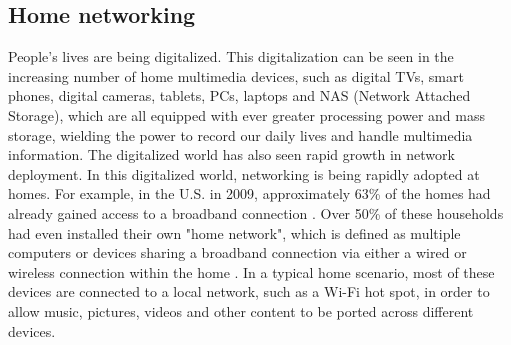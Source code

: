 
\subsection{Home networking}
People's lives are being digitalized. This digitalization can be seen in the
increasing number of home multimedia devices, such as digital TVs, smart
phones, digital cameras, tablets, PCs, laptops and NAS (Network Attached
Storage), which are all equipped with ever greater processing power and mass
storage, wielding the power to record our daily lives and handle multimedia
information. The digitalized world has also seen rapid growth in network
deployment.  In this digitalized world, networking is being rapidly adopted at
homes. For example, in the U.S. in 2009, approximately 63\% of the homes had
already gained access to a broadband connection \cite{stateofHN}. Over 50\% of
these households had even installed their own "home network", which is defined as
multiple computers or devices sharing a broadband connection via either a wired
or wireless connection within the home \cite{stateofHN}. In a typical home
scenario, most of these devices are connected to a local network, such as a
Wi-Fi hot spot, in order to allow music, pictures, videos and other content to
be ported across different devices.

